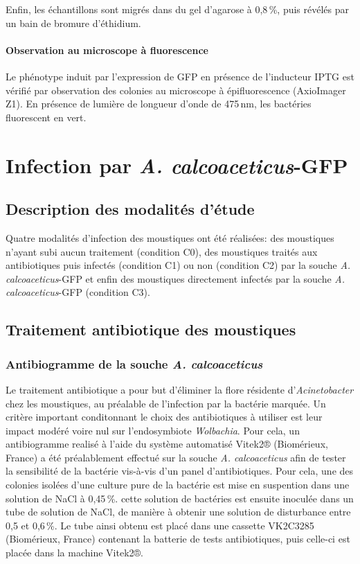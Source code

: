 Enfin, les échantillons sont migrés dans du gel d'agarose à 0,8\,\%, puis révélés par un bain de bromure d'éthidium.

\paragraph{Observation au microscope à fluorescence}
Le phénotype induit par l’expression de GFP en présence de l’inducteur IPTG est vérifié par observation des colonies au microscope à épifluorescence (AxioImager Z1). En présence de lumière de longueur d’onde de 475\,nm, les bactéries fluorescent en vert.

\section{Infection par \textit{A. calcoaceticus}-GFP}

\subsection{Description des modalités d'étude}

Quatre modalités d’infection des moustiques ont été réalisées: des moustiques n’ayant subi aucun traitement (condition C0), des moustiques traités aux antibiotiques puis infectés (condition C1) ou non (condition C2) par la souche \textit{A. calcoaceticus}-GFP et enfin des moustiques directement infectés par la souche \textit{A. calcoaceticus}-GFP (condition C3).

\subsection{Traitement antibiotique des moustiques}

\subsubsection{Antibiogramme de la souche \textit{A. calcoaceticus}}

Le traitement antibiotique a pour but d’éliminer la flore résidente d’\textit{Acinetobacter} chez les moustiques, au préalable de l’infection par la bactérie marquée.
Un critère important conditonnant le choix des antibiotiques à utiliser est leur impact modéré voire nul sur l’endosymbiote \textit{Wolbachia}.
Pour cela, un antibiogramme realisé à l’aide du système automatisé Vitek2® (Biomérieux, France) a été préalablement effectué sur la souche \textit{A. calcoaceticus} afin de tester la sensibilité de la bactérie vis-à-vis d’un panel d’antibiotiques.
Pour cela, une des colonies isolées d’une culture pure de la bactérie est mise en suspention dans une solution de NaCl à 0,45\,\%.
cette solution de bactéries est ensuite inoculée dans un tube de solution de NaCl, de manière à obtenir une solution de disturbance entre 0,5 et 0,6\,\%.
Le tube ainsi obtenu est placé dans une cassette VK2C3285 (Biomérieux, France) contenant la batterie de tests antibiotiques, puis celle-ci est placée dans la machine Vitek2®.

